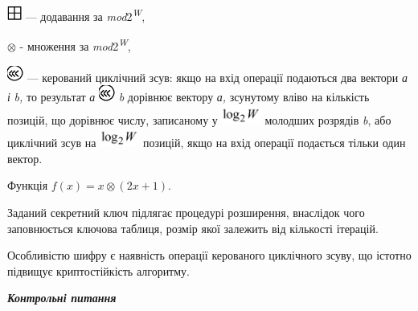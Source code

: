   \includegraphics[width=0.1874in,height=0.1874in]{crypt-img/crypt-img306.png} 
--- додавання за \textit{mod}2\textit{\textsuperscript{W}}, 

  ${{\otimes}}$ - множення за \textit{mod}2\textit{\textsuperscript{W}},

 \includegraphics[width=0.2083in,height=0.2083in]{crypt-img/crypt-img307.png}  ---
керований циклічний зсув: якщо на вхід операції подаються два вектори \textit{а
і }\textit{b}\textit{,} то результат  \textit{а}
\includegraphics[width=0.2083in,height=0.2083in]{crypt-img/crypt-img308.png}
\textit{ }\textit{b}\textit{ }дорівнює вектору \textit{а,} зсунутому вліво на
кількість позицій, що дорівнює числу, записаному у 
\includegraphics[width=0.5138in,height=0.25in]{crypt-img/crypt-img309.png} 
молодших розрядів \textit{b},\textit{ }або циклічний зсув на 
\includegraphics[width=0.5138in,height=0.25in]{crypt-img/crypt-img310.png}
позицій, якщо на вхід операції подається тільки один вектор.


\bigskip


\bigskip


\bigskip

Функція  ${f(x)=x{\otimes}(2x+1)}$.

Заданий секретний ключ підлягає процедурі розширення, внаслідок чого
заповнюється ключова таблиця, розмір якої залежить від кількості ітерацій.

Особливістю шифру є наявність операції керованого циклічного зсуву, що істотно
підвищує криптостійкість алгоритму.


\bigskip


\bigskip

{\centering\bfseries\itshape
Контрольні питання
\par}


\bigskip


\bigskip

